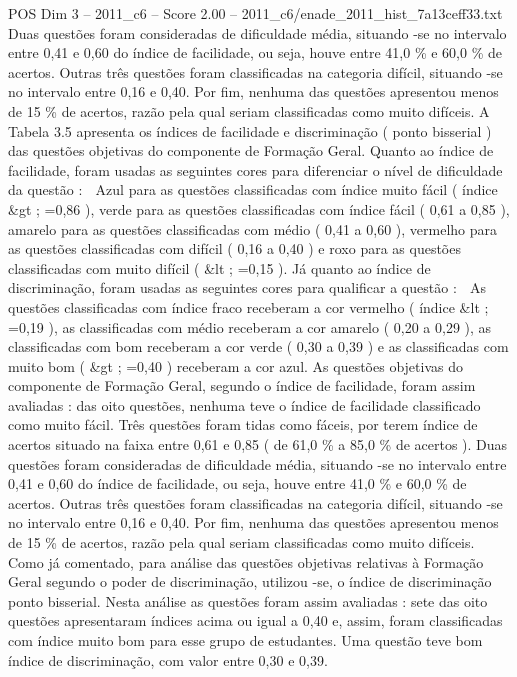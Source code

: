 \begin{textsample}{POS Dim 3 – 2011\_c6 – Score 2.00 – 2011\_c6/enade\_2011\_hist\_7a13ceff33.txt}
Duas questões foram consideradas de dificuldade média, situando -se no intervalo entre 0,41 e 0,60 do índice de facilidade, ou seja, houve entre 41,0 \% e 60,0 \% de acertos.
Outras três questões foram classificadas na categoria difícil, situando -se no intervalo entre 0,16 e 0,40.
Por fim, nenhuma das questões apresentou menos de 15 \% de acertos, razão pela qual seriam classificadas como muito difíceis.
A Tabela 3.5 apresenta os índices de facilidade e discriminação ( ponto bisserial ) das questões objetivas do componente de Formação Geral.
Quanto ao índice de facilidade, foram usadas as seguintes cores para diferenciar o nível de dificuldade da questão :  Azul para as questões classificadas com índice muito fácil ( índice \&gt ; =0,86 ), verde para as questões classificadas com índice fácil ( 0,61 a 0,85 ), amarelo para as questões classificadas com médio ( 0,41 a 0,60 ), vermelho para as questões classificadas com difícil ( 0,16 a 0,40 ) e roxo para as questões classificadas com muito difícil ( \&lt ; =0,15 ).
Já quanto ao índice de discriminação, foram usadas as seguintes cores para qualificar a questão :  As questões classificadas com índice fraco receberam a cor vermelho ( índice \&lt ; =0,19 ), as classificadas com médio receberam a cor amarelo ( 0,20 a 0,29 ), as classificadas com bom receberam a cor verde ( 0,30 a 0,39 ) e as classificadas com muito bom ( \&gt ; =0,40 ) receberam a cor azul.
As questões objetivas do componente de Formação Geral, segundo o índice de facilidade, foram assim avaliadas : das oito questões, nenhuma teve o índice de facilidade classificado como muito fácil.
Três questões foram tidas como fáceis, por terem índice de acertos situado na faixa entre 0,61 e 0,85 ( de 61,0 \% a 85,0 \% de acertos ).
Duas questões foram consideradas de dificuldade média, situando -se no intervalo entre 0,41 e 0,60 do índice de facilidade, ou seja, houve entre 41,0 \% e 60,0 \% de acertos.
Outras três questões foram classificadas na categoria difícil, situando -se no intervalo entre 0,16 e 0,40.
Por fim, nenhuma das questões apresentou menos de 15 \% de acertos, razão pela qual seriam classificadas como muito difíceis.
Como já comentado, para análise das questões objetivas relativas à Formação Geral segundo o poder de discriminação, utilizou -se, o índice de discriminação ponto bisserial.
Nesta análise as questões foram assim avaliadas : sete das oito questões apresentaram índices acima ou igual a 0,40 e, assim, foram classificadas com índice muito bom para esse grupo de estudantes.
Uma questão teve bom índice de discriminação, com valor entre 0,30 e 0,39.

\end{textsample}
